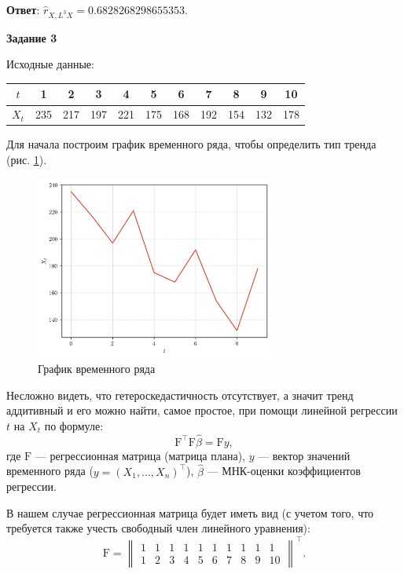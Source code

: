 \documentclass[12pt, a4paper]{extarticle}
\newenvironment*{dummyenv}{}{}
\newcommand{\mysection}[1]{
    \addcontentsline{toc}{section}{#1}
    \begin{dummyenv}
        \bfseries\large #1
    \end{dummyenv}
}
\begin{document}
\textbf{Ответ}: $\hat{r}_{X, L^3 X} = 0.6828268298655353$.
\\

\mysection{Задание 3}

Исходные данные:
\begin{table}[h!]
    \centering
    \begin{tabular}{|c|c|c|c|c|c|c|c|c|c|c|}
        \hline
        $t$ & 1 & 2 & 3 & 4 & 5 & 6 & 7 & 8 & 9 & 10 \\
        \hline
        $X_t$ & 235 & 217 & 197 & 221 & 175 & 168 & 192 & 154 & 132 & 178 \\
        \hline
    \end{tabular}
\end{table}

Для начала построим график временного ряда, чтобы определить тип тренда (рис. \ref{fig:task-3-ts}).

\begin{figure}[h!]
    \centering
    \includegraphics[width=0.7\textwidth]{task-3.png}
    \caption{График временного ряда}
    \label{fig:task-3-ts}
\end{figure}

Несложно видеть, что гетероскедастичность отсутствует, а значит тренд аддитивный и его можно найти,
самое простое, при помощи линейной регрессии $t$ на $X_t$ по формуле:
\begin{equation*}
    \text{F}^\top\text{F} \hat{\beta} = \text{F} y,
\end{equation*}
где $\text{F}$ --- регрессионная матрица (матрица плана), $y$ --- вектор значений временного ряда 
($y = (X_1,...,X_n) ^ \top$), $\hat{\beta}$ --- МНК-оценки коэффициентов регрессии.

В нашем случае регрессионная матрица будет иметь вид (с учетом того, что требуется также учесть
свободный член линейного уравнения):
\begin{equation*}
    \text{F} = \begin{Vmatrix}
        1 & 1 & 1 & 1 & 1 & 1 & 1 & 1 & 1 & 1  \\
        1 & 2 & 3 & 4 & 5 & 6 & 7 & 8 & 9 & 10
    \end{Vmatrix} ^ \top.
\end{equation*}
\end{document}
